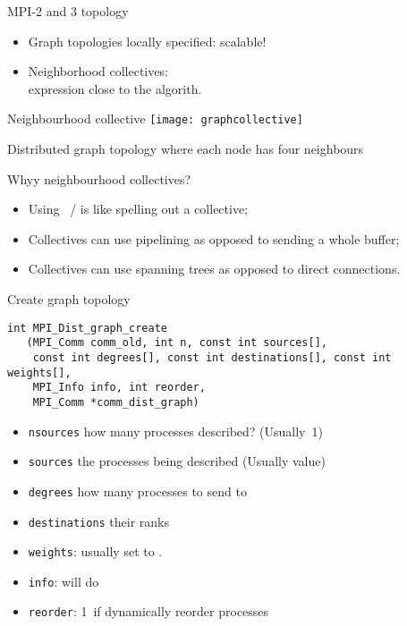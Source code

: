 \begin{frame}[containsverbatim]{MPI-2  and 3 topology}
  \begin{itemize}
  \item Graph topologies locally specified: scalable!
  \item Neighborhood collectives:\\
    expression close to the algorith.
  \end{itemize}
\end{frame}

\begin{frame}{Neighbourhood collective}
  \label{fig:graphcollective}
  \texttt{[image: graphcollective]}

  Distributed graph topology where each
  node has four neighbours
\end{frame}

\begin{frame}[containsverbatim]{Whyy neighbourhood collectives?}
  \begin{itemize}
  \item Using ~/  is like spelling out a collective;
  \item Collectives can use pipelining as opposed to sending a whole
    buffer;
  \item Collectives can use spanning trees as opposed to direct connections.
  \end{itemize}
\end{frame}

\begin{frame}[containsverbatim]{Create graph topology}
\lstset{language=C}
\begin{lstlisting}
int MPI_Dist_graph_create
   (MPI_Comm comm_old, int n, const int sources[],
    const int degrees[], const int destinations[], const int weights[],
    MPI_Info info, int reorder,
    MPI_Comm *comm_dist_graph)
\end{lstlisting}
\begin{itemize}
\item \lstinline{nsources} how many processes described? (Usually~1)
\item \lstinline{sources} the processes being described (Usually
   value)
\item \lstinline{degrees} how many processes to send to
\item \lstinline{destinations} their ranks
\item \lstinline{weights}: usually set to .
\item \lstinline{info}:  will do
\item \lstinline{reorder}: 1~if dynamically reorder processes
\end{itemize}
\end{frame}

